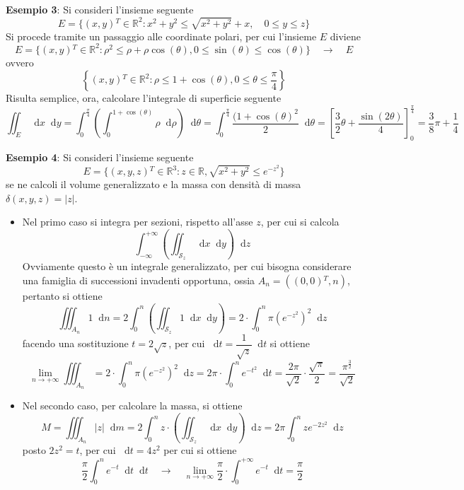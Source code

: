 \documentclass[a4paper]{extarticle}
\newcommand*\dif{\mathop{}\!\mathrm{d}}
\begin{document}
\vspace{2em}
\noindent
\textbf{Esempio 3}: Si consideri l'insieme seguente
\[E = \{(x,y){^T} \in \mathbb{R}^2 : x^2+y^2 \leq \sqrt{x^2+y^2} + x, \hspace{1em} 0 \leq y \leq z\}\]
Si procede tramite un passaggio alle coordinate polari, per cui l'insieme $E$ diviene
\[E = \{(x,y){^T} \in \mathbb{R}^2 : \rho^2 \leq \rho + \rho \cos(\theta), 0 \leq \sin(\theta) \leq \cos(\theta)\} \hspace{1em} \rightarrow \hspace{1em} E\]
ovvero
\[\left\{(x,y){^T} \in \mathbb{R}^2 : \rho \leq 1+\cos(\theta), 0 \leq \theta \leq \dfrac{\pi}{4} \right\} \]
Risulta semplice, ora, calcolare l'integrale di superficie seguente
\[\iint_E \dif x \dif y = \int_0^{\frac{\pi}{4}} \left(\int_0^{1+\cos(\theta)} \rho \dif \rho\right) \dif \theta = \int_0^{\frac{\pi}{4}} \dfrac{(1+\cos(\theta)^2}{2} \dif \theta = \left[\dfrac{3}{2}\theta + \dfrac{\sin(2\theta)}{4}\right]_0^{\frac{\pi}{4}} = \dfrac{3}{8}\pi + \dfrac{1}{4}\]

\vspace{2em}
\noindent
\textbf{Esempio 4}: Si consideri l'insieme seguente
\[E = \{(x,y,z){^T} \in \mathbb{R}^3 : z \in \mathbb{R}, \sqrt{x^2+y^2} \leq e^{-z^2}\}\]
se ne calcoli il volume generalizzato e la massa con densità di massa $\delta(x,y,z)=\vert z \vert$.

\begin{itemize}
    \item Nel primo caso si integra per sezioni, rispetto all'asse $z$, per cui si calcola
    \[\int_{-\infty}^{+\infty} \left(\iint_{\mathcal{S}_z} \dif x \dif y\right) \dif z\]
    Ovviamente questo è un integrale generalizzato, per cui bisogna considerare una famiglia di successioni invadenti opportuna, ossia $A_n = ((0,0){^T}, n)$, pertanto si ottiene
    \[\iiint_{A_n} 1 \dif n = 2 \int_0^n \left(\iint_{\mathcal{S}_z} 1 \dif x \dif y\right) = 2 \cdot \int_0^n \pi \left(e^{-z^2}\right)^2 \dif z\]
    facendo una sostituzione $t=2\sqrt{z}$, per cui $\dif t = \dfrac{1}{\sqrt{z}} \dif t$ si ottiene
    \[\lim_{n \to +\infty} \iiint_{A_n} = 2 \cdot \int_0^n \pi \left(e^{-z^2}\right)^2 \dif z = 2\pi \cdot \int_0^n e^{-t^2} \dif t = \dfrac{2\pi}{\sqrt{2}} \cdot \dfrac{\sqrt{\pi}}{2} = \dfrac{\pi^{\frac{3}{2}}}{\sqrt{2}}\]

    \item Nel secondo caso, per calcolare la massa, si ottiene
    \[M = \iiint_{A_n} \vert z \vert \dif m = 2 \int_0^n z \cdot \left(\iint_{\mathcal{S}_z} \dif x \dif y\right) \dif z = 2\pi \int_0^n z e^{-2z^2} \dif z\]
    posto $2z^2 = t$, per cui $\dif t = 4z^2$ per cui si ottiene
    \[\frac{\pi}{2} \int_0^n e^{-t} \dif t \dif t \hspace{1em} \rightarrow \hspace{1em} \lim_{n \to +\infty} \dfrac{\pi}{2} \cdot \int_0^{+\infty} e^{-t} \dif t = \dfrac{\pi}{2}\]
\end{itemize}
\end{document}
